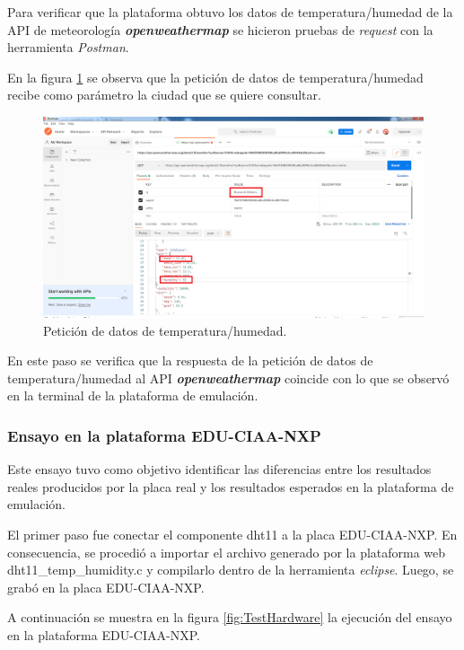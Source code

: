 Para verificar que la plataforma obtuvo los datos de temperatura/humedad de la API de meteorología  \textit{\textbf{openweathermap}} se hicieron pruebas de \textit{request} con la herramienta \textit{Postman}.

En la figura \ref{fig:RespuestaPostMan1} se observa que la petición de datos de temperatura/humedad recibe como parámetro la ciudad que se quiere consultar.



\begin{figure}[ht]
	\centering
	\includegraphics[scale=.30]{./Figures/RespuestaPostMan1.png}
	\caption{Petición de datos de temperatura/humedad.}
	\label{fig:RespuestaPostMan1}
\end{figure}

En este paso se verifica que la respuesta de la petición de datos de temperatura/humedad al API \textit{\textbf{openweathermap}} coincide con lo que se observó en la terminal de la plataforma de emulación.


\subsubsection{Ensayo en la plataforma EDU-CIAA-NXP} 

Este ensayo tuvo como objetivo identificar
las diferencias entre los resultados reales producidos por la placa real y los resultados esperados en la plataforma de emulación.

El primer paso fue conectar el componente dht11 a la placa EDU-CIAA-NXP. En consecuencia, se procedió a importar el archivo generado por la plataforma web  \textquotedbl dht11\_temp\_humidity.c\textquotedbl{} y compilarlo                     dentro de la herramienta 
\textit{eclipse}. Luego, se grabó en la placa EDU-CIAA-NXP.

A continuación se muestra en la figura \ref{fig:TestHardware} la ejecución del ensayo en la plataforma EDU-CIAA-NXP.

